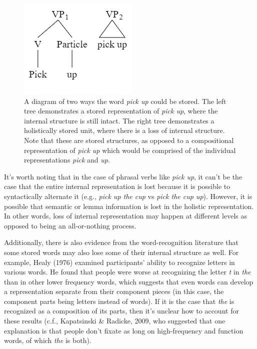 \documentclass[
  man,floatsintext]{apa6}
\begin{document}
\begin{figure}

{\centering \includegraphics[width=0.3\linewidth]{Figures/syntax_tree} 

}

\caption{A diagram of two ways the word \emph{pick up} could be stored. The left tree demonstrates a stored representation of \emph{pick up}, where the internal structure is still intact. The right tree demonstrates a holistically stored unit, where there is a loss of internal structure. Note that these are stored structures, as opposed to a compositional representation of \emph{pick up} which would be comprised of the individual representations \emph{pick} and \emph{up}.}\label{fig:lossInternal}
\end{figure}

It's worth noting that in the case of phrasal verbs like \emph{pick up}, it can't be the case that the entire internal representation is lost because it is possible to syntactically alternate it (e.g., \emph{pick up the cup} vs \emph{pick the cup up}). However, it is possible that semantic or lemma information is lost in the holistic representation. In other words, loss of internal representation may happen at different levels as opposed to being an all-or-nothing process.

Additionally, there is also evidence from the word-recognition literature that some stored words may also lose some of their internal structure as well. For example, Healy (1976) examined participants' ability to recognize letters in various words. He found that people were worse at recognizing the letter \emph{t} in \emph{the} than in other lower frequency words, which suggests that even words can develop a representation separate from their component pieces (in this case, the component parts being letters instead of words). If it is the case that \emph{the} is recognized as a composition of its parts, then it's unclear how to account for these results (c.f., Kapatsinski \& Radicke, 2009, who suggested that one explanation is that people don't fixate as long on high-frequency and function words, of which \emph{the} is both).
\end{document}
